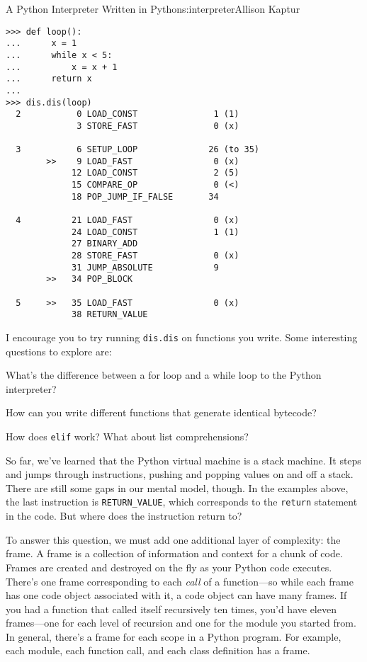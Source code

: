 \begin{aosachapter}{A Python Interpreter Written in Python}{s:interpreter}{Allison Kaptur}
\begin{verbatim}
>>> def loop():
...      x = 1
...      while x < 5:
...          x = x + 1
...      return x
...
>>> dis.dis(loop)
  2           0 LOAD_CONST               1 (1)
              3 STORE_FAST               0 (x)

  3           6 SETUP_LOOP              26 (to 35)
        >>    9 LOAD_FAST                0 (x)
             12 LOAD_CONST               2 (5)
             15 COMPARE_OP               0 (<)
             18 POP_JUMP_IF_FALSE       34

  4          21 LOAD_FAST                0 (x)
             24 LOAD_CONST               1 (1)
             27 BINARY_ADD
             28 STORE_FAST               0 (x)
             31 JUMP_ABSOLUTE            9
        >>   34 POP_BLOCK

  5     >>   35 LOAD_FAST                0 (x)
             38 RETURN_VALUE
\end{verbatim}

\label{explore-bytecode}

I encourage you to try running \texttt{dis.dis} on functions you write.
Some interesting questions to explore are:

\begin{aosaitemize}

\item
  What's the difference between a for loop and a while loop to the
  Python interpreter?
\item
  How can you write different functions that generate identical
  bytecode?
\item
  How does \texttt{elif} work? What about list comprehensions?
\end{aosaitemize}

\label{frames}

So far, we've learned that the Python virtual machine is a stack
machine. It steps and jumps through instructions, pushing and popping
values on and off a stack. There are still some gaps in our mental
model, though. In the examples above, the last instruction is
\texttt{RETURN\_VALUE}, which corresponds to the \texttt{return}
statement in the code. But where does the instruction return to?

To answer this question, we must add one additional layer of complexity:
the frame. A frame is a collection of information and context for a
chunk of code. Frames are created and destroyed on the fly as your
Python code executes. There's one frame corresponding to each
\emph{call} of a function---so while each frame has one code object
associated with it, a code object can have many frames. If you had a
function that called itself recursively ten times, you'd have eleven
frames---one for each level of recursion and one for the module you
started from. In general, there's a frame for each scope in a Python
program. For example, each module, each function call, and each class
definition has a frame.


\end{aosachapter}
